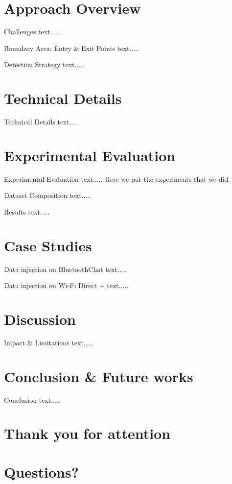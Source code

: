 \documentclass[10pt]{beamer}
\begin{document}
\section{Approach Overview}
\begin{frame}[fragile]{Challenges}
text.....		
\end{frame}

\begin{frame}[fragile]{Boundary Area: Entry \& Exit Points}
text.....		
\end{frame}

\begin{frame}[fragile]{Detection Strategy}
text.....		
\end{frame}

\section{Technical Details}
\begin{frame}[fragile]{Technical Details}
text.....		
\end{frame}

\section{Experimental Evaluation}
\begin{frame}[fragile]{Experimental Evaluation}
text..... Here we put the experiments that we did		
\end{frame}

\begin{frame}[fragile]{Dataset Composition}
text.....		
\end{frame}

\begin{frame}[fragile]{Results}
text.....		
\end{frame}

\section{Case Studies}
\begin{frame}[fragile]{Data injection on BluetoothChat}
text.....		
\end{frame}

\begin{frame}[fragile]{Data injection on Wi-Fi Direct +}
text.....		
\end{frame}


\section{Discussion}
\begin{frame}[fragile]{Impact \& Limitations}
text.....		
\end{frame}

\section{Conclusion \& Future works}
\begin{frame}[fragile]{Conclusion}
text.....		
\end{frame}

\section*{Thank you for attention}

\section*{Questions?}
\end{document}
